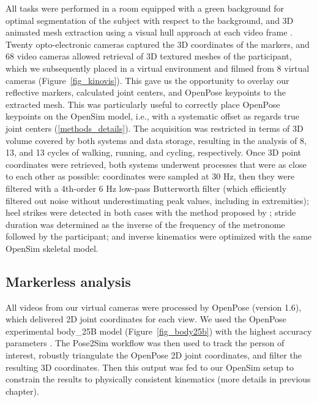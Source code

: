 All tasks were performed in a room equipped with a green background for optimal segmentation of the subject with respect to the background, and 3D animated mesh extraction using a visual hull approach at each video frame \cite{Laurentini1994}. Twenty opto-electronic cameras captured the 3D coordinates of the markers, and 68 video cameras allowed retrieval of 3D textured meshes of the participant, which we subsequently placed in a virtual environment and filmed from 8 virtual cameras (Figure~\ref{fig_kinovis}). This gave us the opportunity to overlay our reflective markers, calculated joint centers, and OpenPose keypoints to the extracted mesh. This was particularly useful to correctly place OpenPose keypoints on the OpenSim model, i.e., with a systematic offset as regards true joint centers (\autoref{methods_details}). The acquisition was restricted in terms of 3D volume covered by both systems and data storage, resulting in the analysis of 8, 13, and 13 cycles of walking, running, and cycling, respectively. Once 3D point coordinates were retrieved, both systems underwent processes that were as close to each other as possible: coordinates were sampled at 30 Hz, then they were filtered with a 4th-order 6 Hz low-pass Butterworth filter (which efficiently filtered out noise without underestimating peak values, including in extremities); heel strikes were detected in both cases with the method proposed by \cite{Zeni2008}; stride duration was determined as the inverse of the frequency of the metronome followed by the participant; and inverse kinematics were optimized with the same OpenSim skeletal model.

\subsection{Markerless analysis}

All videos from our virtual cameras were processed by OpenPose (version 1.6), which delivered 2D joint coordinates for each view. We used the OpenPose experimental body\_25B model (Figure~\ref{fig_body25b}) with the highest accuracy parameters \cite{Hidalgo2021}. The Pose2Sim workflow was then used to track the person of interest, robustly triangulate the OpenPose 2D joint coordinates, and filter the resulting 3D coordinates. Then this output was fed to our OpenSim setup to constrain the results to physically consistent kinematics (more details in previous chapter). 

